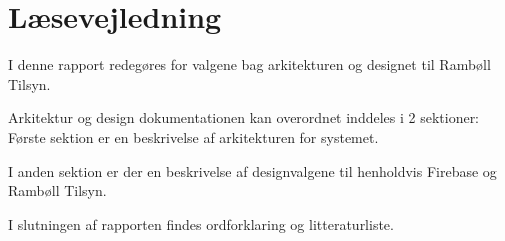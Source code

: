\chapter*{Læsevejledning}
I denne rapport redegøres for valgene bag arkitekturen og designet til Rambøll Tilsyn. 

Arkitektur og design dokumentationen kan overordnet inddeles i 2 sektioner:\\
Første sektion er en beskrivelse af arkitekturen for systemet.

I anden sektion er der en beskrivelse af designvalgene til henholdvis Firebase og Rambøll Tilsyn.

I slutningen af rapporten  findes ordforklaring og litteraturliste.
